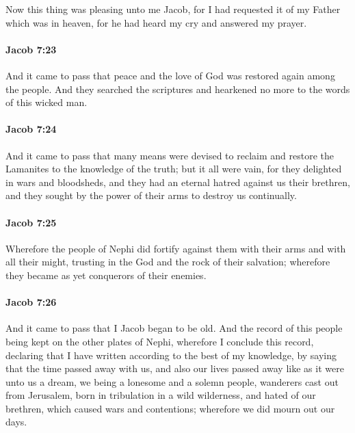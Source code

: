 			Now this thing was pleasing unto me Jacob,
			for I had requested it of my Father which was in heaven,
			for he had heard my cry and answered my prayer.

		\paragraph{Jacob 7:23} %
			\label{JACOB-7-23}

			And it came to pass that
			peace and the love of God was restored again among the people.
			And they searched the scriptures
			and hearkened no more to the words of this wicked man.

		\paragraph{Jacob 7:24} %
			\label{JACOB-7-24}

			And it came to pass that many means were devised
			to reclaim and restore the Lamanites to the knowledge of the truth;
			but it all were vain,
			for they delighted in wars and bloodsheds,
			and they had an eternal hatred against us their brethren,
			and they sought by the power of their arms to destroy us continually.

		\paragraph{Jacob 7:25} %
			\label{JACOB-7-25}

			Wherefore the people of Nephi did fortify against them
			with their arms and with all their might,
			trusting in the God and the rock of their salvation;
			wherefore they became as yet conquerors of their enemies.

		\paragraph{Jacob 7:26} %
			\label{JACOB-7-26}

			And it came to pass that I Jacob began to be old.
			And the record of this people being kept on the other plates of Nephi,
			wherefore I conclude this record,
			declaring that I have written according to the best of my knowledge,
			by saying that the time passed away with us,
			and also our lives passed away like as it were unto us a dream,
			we being a lonesome and a solemn people,
			wanderers cast out from Jerusalem,
			born in tribulation in a wild wilderness,
			and hated of our brethren, which caused wars and contentions;
			wherefore we did mourn out our days.

